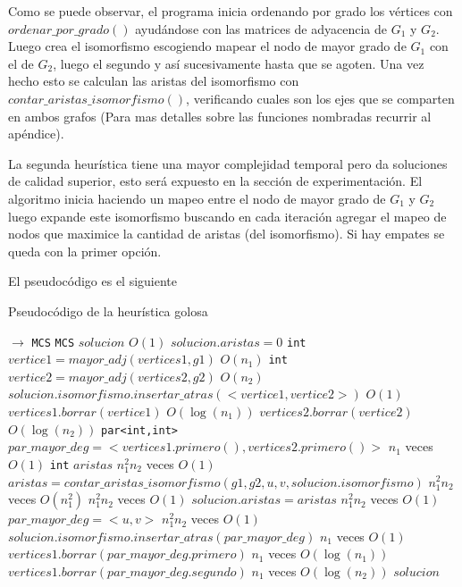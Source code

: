 Como se puede observar, el programa inicia ordenando por grado los vértices con $ordenar\_por\_grado()$ ayudándose con las matrices de adyacencia de $G_1$ y $G_2$. Luego crea el isomorfismo escogiendo mapear el nodo de mayor grado de $G_1$ con el de $G_2$, luego el segundo y así sucesivamente hasta que se agoten. Una vez hecho esto se calculan las aristas del isomorfismo con $contar\_aristas\_isomorfismo()$, verificando cuales son los ejes que se comparten en ambos grafos (Para mas detalles sobre las funciones nombradas recurrir al apéndice).

La segunda heurística tiene una mayor complejidad temporal pero da soluciones de calidad superior, esto será expuesto en la sección de experimentación. El algoritmo inicia haciendo un mapeo entre el nodo de mayor grado de $G_1$ y $G_2$ luego expande este isomorfismo buscando en cada iteración agregar el mapeo de nodos que maximice la cantidad de aristas (del isomorfismo). Si hay empates se queda con la primer opción.

El pseudocódigo es el siguiente

\begin{algorithm}[H]
  \begin{algorithmic}[1]
  \caption{Pseudocódigo de la heurística golosa}
  \label{algo:4-1}
     $\to$ \texttt{MCS}
      \State \texttt{MCS} $solucion$ 
        \Comment $O(1)$ 
      \State $solucion.aristas = 0$ 
      \State \texttt{int} $vertice1 = mayor\_adj(vertices1,g1)$ 
      \Comment $O(n_1)$ 
      \State \texttt{int} $vertice2 = mayor\_adj(vertices2,g2)$ 
      \Comment $O(n_2)$ 
      \State $solucion.isomorfismo.insertar\_atras(<vertice1,vertice2>)$
      \Comment $O(1)$
      \State $vertices1.borrar(vertice1)$ 
      \Comment $O(\log(n_1))$ 
      \State $vertices2.borrar(vertice2)$ 
      \Comment $O(\log(n_2))$
	  \State \texttt{par<int,int>}  $par\_mayor\_deg = <vertices1.primero(),vertices2.primero()>$ 
    \Comment $n_1$ veces $O(1)$
	  \State \texttt{int} $aristas$
    \Comment $n_1^2n_2$ veces $O(1)$
	  \State $ aristas = contar\_aristas\_isomorfismo(g1,g2,u,v, solucion.isomorfismo)$
    \Comment $n_1^2n_2$ veces $O(n_1^2)$
      \Comment $n_1^2n_2$ veces $O(1)$
      \State $solucion.aristas = aristas$
      \Comment $n_1^2n_2$ veces $O(1)$
      \State $par\_mayor\_deg = <u,v>$
      \Comment $n_1^2n_2$ veces $O(1)$
      \EndIf
	  \EndFor
	  \EndFor	 
	  \State  $solucion.isomorfismo.insertar\_atras(par\_mayor\_deg)$
      \Comment $n_1$ veces $O(1)$
	  \State $ vertices1.borrar(par\_mayor\_deg.primero)$
      \Comment $n_1$ veces $O(\log(n_1))$
	  \State $ vertices1.borrar(par\_mayor\_deg.segundo)$
      \Comment $n_1$ veces $O(\log(n_2))$
	  \EndWhile      
        \State \Return $solucion$
      \EndProcedure
	\end{algorithmic}
\end{algorithm}

